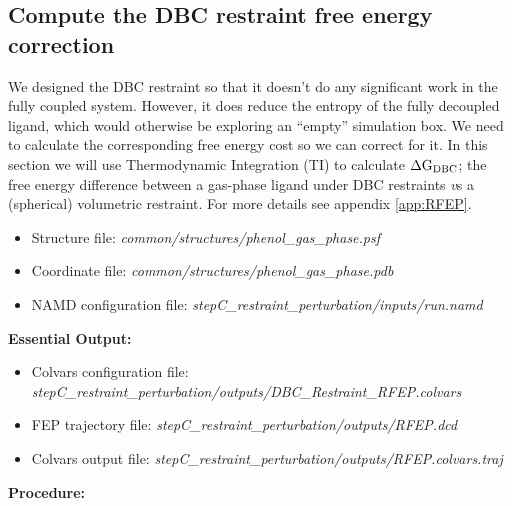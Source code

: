 \documentclass[9pt,tutorial]{Styling/livecoms}
\newcommand{\filepath}[1]{\textit{#1}}
\begin{document}
    
\subsection{Compute the DBC restraint free energy correction}
\label{step:restraintPerturbation}
    \begin{tcolorbox}[colback=blue!5!white,colframe=blue!75!black]
    We designed the DBC restraint so that it doesn't do any significant work in the fully coupled system. However, it does reduce the entropy of the fully decoupled ligand, which would otherwise be exploring an ``empty'' simulation box. We need to calculate the corresponding free energy cost so we can correct for it. In this section we will use Thermodynamic Integration (TI) to calculate $\Delta \rm G_{\rm{DBC}}$; the free energy difference between a gas-phase ligand under DBC restraints {\textit vs} a (spherical) volumetric restraint. For more details see appendix \ref{app:RFEP}.
    \end{tcolorbox}

    \begin{itemize}
        \item Structure file: \filepath{common/structures/phenol\_gas\_phase.psf} 
        \item Coordinate file: \filepath{common/structures/phenol\_gas\_phase.pdb}
        \item NAMD configuration file: \filepath{stepC\_restraint\_perturbation/inputs/run.namd}
    \end{itemize}
    \textbf{Essential Output:}
    \begin{itemize}
        \item Colvars configuration file: \filepath{stepC\_restraint\_perturbation/outputs/DBC\_Restraint\_RFEP.colvars}
        \item FEP trajectory file: \filepath{stepC\_restraint\_perturbation/outputs/RFEP.dcd}
        \item Colvars output file: \filepath{stepC\_restraint\_perturbation/outputs/RFEP.colvars.traj}
    \end{itemize}
    \textbf{Procedure:}
\end{document}
